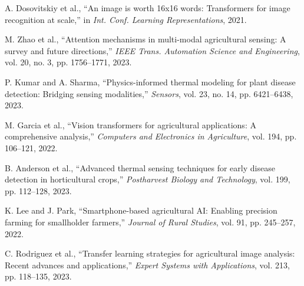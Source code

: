 \documentclass[conference]{IEEEtran}
\begin{document}
\begin{thebibliography}{00}
A. Dosovitskiy et al., ``An image is worth 16x16 words: Transformers for image recognition at scale,'' in \textit{Int. Conf. Learning Representations}, 2021.

M. Zhao et al., ``Attention mechanisms in multi-modal agricultural sensing: A survey and future directions,'' \textit{IEEE Trans. Automation Science and Engineering}, vol. 20, no. 3, pp. 1756--1771, 2023.

P. Kumar and A. Sharma, ``Physics-informed thermal modeling for plant disease detection: Bridging sensing modalities,'' \textit{Sensors}, vol. 23, no. 14, pp. 6421--6438, 2023.

M. Garcia et al., ``Vision transformers for agricultural applications: A comprehensive analysis,'' \textit{Computers and Electronics in Agriculture}, vol. 194, pp. 106--121, 2022.

B. Anderson et al., ``Advanced thermal sensing techniques for early disease detection in horticultural crops,'' \textit{Postharvest Biology and Technology}, vol. 199, pp. 112--128, 2023.

K. Lee and J. Park, ``Smartphone-based agricultural AI: Enabling precision farming for smallholder farmers,'' \textit{Journal of Rural Studies}, vol. 91, pp. 245--257, 2022.

C. Rodriguez et al., ``Transfer learning strategies for agricultural image analysis: Recent advances and applications,'' \textit{Expert Systems with Applications}, vol. 213, pp. 118--135, 2023.

\end{thebibliography}
\end{document}
